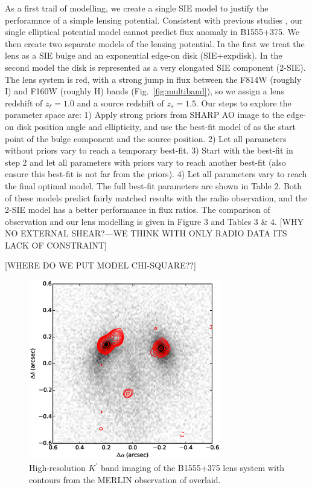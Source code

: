 \documentclass[useAMS,usenatbib]{mn2e}
\begin{document}
As a first trail of modelling, we create a single SIE model to 
justify the perforamnce of a simple lensing potential. Consistent with previous studies
\citep{Marlow, Xu14}, our single elliptical potential model cannot predict flux anomaly in B1555+375. 
We then create two separate models of the lensing potential.  In the
first we treat the lens as a SIE bulge and an exponential edge-on disk
(SIE+expdisk).  In the second model the disk is represented as a very
elongated SIE component (2-SIE).  The lens system is red, with a
strong jump in flux between the F814W (roughly I) and F160W (roughly
H) bands (Fig.~\ref{fig:multiband}), so we assign a lens redshift of
$z_\ell = 1.0$ and a source redshift of $z_s =1.5$. Our steps to explore the parameter space are: 1) Apply strong priors from SHARP AO image to the edge-on disk position angle and ellipticity, and use the best-fit model of \citet{marlow} as the start point of the bulge component and the source position. 2) Let all parameters without priors vary to reach a temporary best-fit. 3) Start with the best-fit in step 2 and let all parameters with priors vary to reach another best-fit (also ensure this best-fit is not far from the priors). 4) Let all parameters vary to reach the final optimal model. 
The full best-fit parameters are shown in Table
2. Both of these models predict fairly matched results with the radio
observation, and the 2-SIE model has a better performance in flux
ratios. The comparison of observation and our lens modelling is given
in Figure 3 and Tables 3 \& 4.
[WHY NO EXTERNAL SHEAR?---WE THINK WITH ONLY RADIO DATA ITS LACK OF CONSTRAINT]

[WHERE DO WE PUT MODEL CHI-SQUARE??]

\begin{figure}
\includegraphics[width=84mm]{1555_ao_merlin_overlay.eps}
\caption{High-resolution  $K^\prime$ band imaging of the B1555+375 lens system 
with contours from the MERLIN observation of \citet{Marlow} overlaid.
%
\label{fig:merlin}}
\end{figure}
\end{document}
